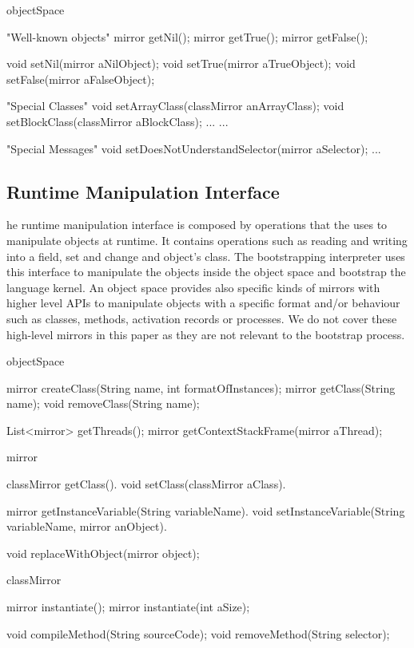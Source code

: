 \begin{code}
objectSpace{
    "Well-known objects"
    mirror getNil();
    mirror getTrue();
    mirror getFalse();

    void setNil(mirror aNilObject);
    void setTrue(mirror aTrueObject);
    void setFalse(mirror aFalseObject);
    
    "Special Classes"
    void setArrayClass(classMirror anArrayClass);
    void setBlockClass(classMirror aBlockClass);
    ...
    ...
    
    "Special Messages"
    void setDoesNotUnderstandSelector(mirror aSelector);
    ...
}
\end{code}



\subsection{Runtime Manipulation Interface} he runtime manipulation interface is composed by operations that the \VM uses to manipulate objects at runtime. It contains operations such as reading and writing into a field, set and change and object's class. The bootstrapping interpreter uses this interface to manipulate the objects inside the object space and bootstrap the language kernel. An object space provides also specific kinds of mirrors with higher level APIs to manipulate objects with a specific format and/or behaviour such as classes, methods, activation records or processes. We do not cover these high-level mirrors in this paper as they are not relevant to the bootstrap process.

\begin{code}
objectSpace{
    mirror createClass(String name, int formatOfInstances);
    mirror getClass(String name);
    void removeClass(String name);
    
    List<mirror> getThreads();
    mirror getContextStackFrame(mirror aThread);
}

mirror{
    classMirror getClass().
    void setClass(classMirror aClass).

    mirror getInstanceVariable(String variableName).
    void setInstanceVariable(String variableName, mirror anObject).
    
    void replaceWithObject(mirror object);
}

classMirror{
    mirror instantiate();
    mirror instantiate(int aSize);
    
    void compileMethod(String sourceCode);
    void removeMethod(String selector);
}
\end{code}

